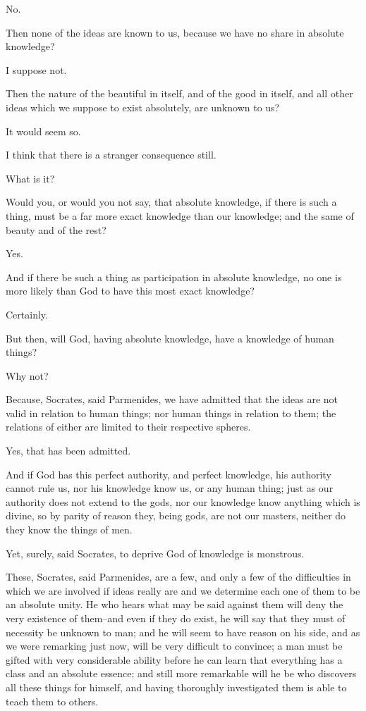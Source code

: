 No.

Then none of the ideas are known to us, because we have no share in
absolute knowledge?

I suppose not.

Then the nature of the beautiful in itself, and of the good in itself,
and all other ideas which we suppose to exist absolutely, are unknown to
us?

It would seem so.

I think that there is a stranger consequence still.

What is it?

Would you, or would you not say, that absolute knowledge, if there is
such a thing, must be a far more exact knowledge than our knowledge; and
the same of beauty and of the rest?

Yes.

And if there be such a thing as participation in absolute knowledge, no
one is more likely than God to have this most exact knowledge?

Certainly.

But then, will God, having absolute knowledge, have a knowledge of human
things?

Why not?

Because, Socrates, said Parmenides, we have admitted that the ideas are
not valid in relation to human things; nor human things in relation to
them; the relations of either are limited to their respective spheres.

Yes, that has been admitted.

And if God has this perfect authority, and perfect knowledge, his
authority cannot rule us, nor his knowledge know us, or any human thing;
just as our authority does not extend to the gods, nor our knowledge
know anything which is divine, so by parity of reason they, being gods,
are not our masters, neither do they know the things of men.

Yet, surely, said Socrates, to deprive God of knowledge is monstrous.

These, Socrates, said Parmenides, are a few, and only a few of the
difficulties in which we are involved if ideas really are and we
determine each one of them to be an absolute unity. He who hears what
may be said against them will deny the very existence of them--and even
if they do exist, he will say that they must of necessity be unknown
to man; and he will seem to have reason on his side, and as we were
remarking just now, will be very difficult to convince; a man must
be gifted with very considerable ability before he can learn that
everything has a class and an absolute essence; and still more
remarkable will he be who discovers all these things for himself, and
having thoroughly investigated them is able to teach them to others.

